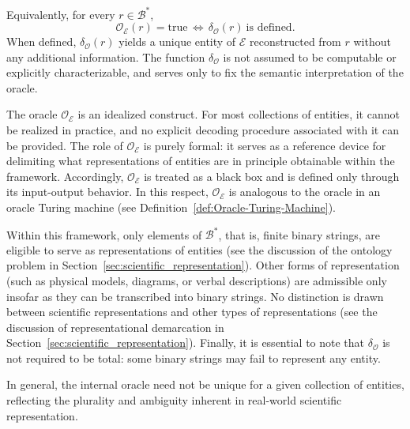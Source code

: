 \noindent
Equivalently, for every \(r \in \mathcal{B}^\ast\),
\[
\mathcal{O}_{\mathcal{E}}(r)=\mathrm{true} \, \Longleftrightarrow \, \delta_{\mathcal{O}}(r)\ \text{is defined}.
\]
When defined, $\delta_{\mathcal{O}}(r)$ yields a unique entity of $\mathcal{E}$ reconstructed from $r$ without any additional information. The function $\delta_{\mathcal{O}}$ is not assumed to be computable or explicitly characterizable, and serves only to fix the semantic interpretation of the oracle.

The oracle $\mathcal{O}_{\mathcal{E}}$ is an idealized construct. For most collections of entities, it cannot be realized in practice, and no explicit decoding procedure associated with it can be provided. The role of $\mathcal{O}_{\mathcal{E}}$ is purely formal: it serves as a reference device for delimiting what representations of entities are in principle obtainable within the framework. Accordingly, $\mathcal{O}_{\mathcal{E}}$ is treated as a black box and is defined only through its input-output behavior. In this respect, $\mathcal{O}_{\mathcal{E}}$ is analogous to the oracle in an oracle Turing machine (see Definition~\ref{def:Oracle-Turing-Machine}).

Within this framework, only elements of $\mathcal{B}^\ast$, that is, finite binary strings, are eligible to serve as representations of entities (see the discussion of the ontology problem in Section~\ref{sec:scientific_representation}). Other forms of representation (such as physical models, diagrams, or verbal descriptions) are admissible only insofar as they can be transcribed into binary strings. No distinction is drawn between scientific representations and other types of representations (see the discussion of representational demarcation in Section~\ref{sec:scientific_representation}). Finally, it is essential to note that $\delta_{\mathcal O}$ is not required to be total: some binary strings may fail to represent any entity.

In general, the internal oracle need not be unique for a given collection of entities, reflecting the plurality and ambiguity inherent in real-world scientific representation.


